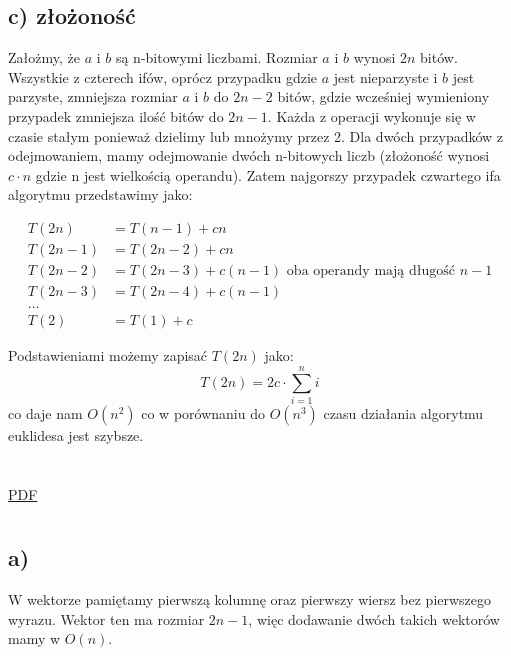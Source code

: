 \documentclass[svgnames]{report}
\begin{document}
\subsection{c) złożoność}
Założmy, że $a$ i $b$ są n-bitowymi liczbami. Rozmiar $a$ i $b$ wynosi $2n$ bitów. Wszystkie z czterech ifów, oprócz przypadku gdzie $a$ jest nieparzyste i $b$ jest parzyste, zmniejsza rozmiar $a$ i $b$ do $2n - 2$ bitów, gdzie wcześniej wymieniony przypadek zmniejsza ilość bitów do $2n-1$. Każda z operacji wykonuje się w czasie stałym ponieważ dzielimy lub mnożymy przez 2. Dla dwóch przypadków z odejmowaniem, mamy odejmowanie dwóch n-bitowych liczb (złożoność wynosi $c\cdot n$ gdzie n jest wielkością operandu). Zatem najgorszy przypadek czwartego ifa algorytmu przedstawimy jako:

\begin{equation*}
\begin{split}
T(2n) & = T(n-1) + cn \\
T(2n -1) & = T(2n - 2) + cn \\
T(2n - 2) & = T(2n - 3) + c(n-1)  \text{   oba operandy mają długość $n-1$} \\
T(2n - 3) & = T(2n - 4) + c(n-1) \\
... &  \\
T(2) &=  T(1) + c
\end{split}
\end{equation*}

Podstawieniami możemy zapisać $T(2n)$ jako:
$$ T(2n) = 2c\cdot \sum_{i=1}^n i $$
co daje nam $O(n^2)$ co w porównaniu do $O(n^3)$ czasu działania algorytmu euklidesa jest szybsze.
\section{} %
\href{./solutions/lista_3_zadanie_2.pdf}{PDF}

\section{} %
\section{} %
\section{} %
\subsection{a)}
W wektorze pamiętamy pierwszą kolumnę oraz pierwszy wiersz bez pierwszego wyrazu. Wektor ten ma rozmiar $2n - 1$, więc dodawanie dwóch takich wektorów mamy w $O(n)$.
\end{document}
